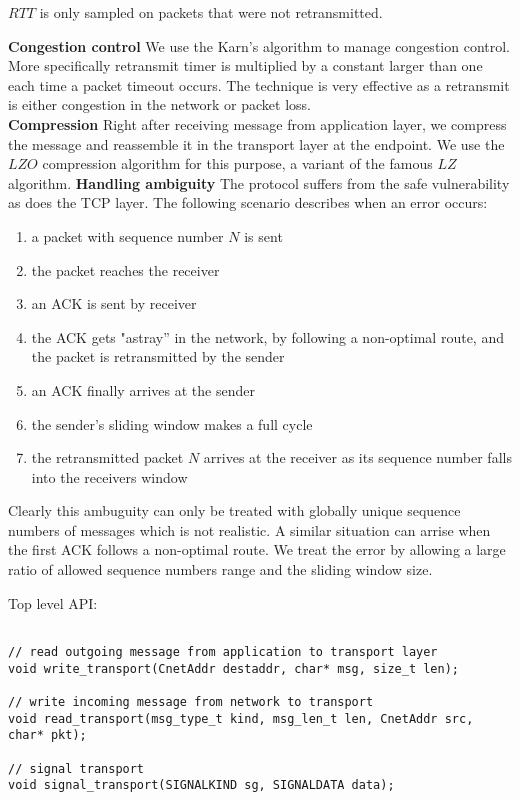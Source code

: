 \documentclass[11pt,a4paper,oneside]{report}
\begin{document}
$RTT$ is only sampled on packets that were not retransmitted. 

\noindent \textbf{Congestion control}
We use the Karn's algorithm to manage congestion control. More specifically
retransmit timer is multiplied by a constant larger than one each time a packet
timeout occurs. The technique is very effective as a retransmit is either
congestion in the network or packet loss. \\
\noindent \textbf{Compression}
Right after receiving message from application layer, we compress the message
and reassemble it in the transport layer at the endpoint. We use the $LZO$
compression algorithm for this purpose, a variant of the famous $LZ$ algorithm.
\noindent \textbf{Handling ambiguity}
The protocol suffers from the safe vulnerability as does the TCP layer. 
The following scenario describes when an error occurs:
\begin{enumerate}
\item a packet with sequence number $N$ is sent
\item the packet reaches the receiver
\item an ACK is sent by receiver
\item the ACK gets "astray'' in the network, by following a non-optimal route, and the packet is retransmitted by the sender
\item an ACK finally arrives at the sender
\item the sender's sliding window makes a full cycle
\item the retransmitted packet $N$ arrives at the receiver as its sequence number falls into the receivers window
\end{enumerate}

Clearly this ambuguity can only be treated with globally unique sequence numbers of messages which is not realistic.
A similar situation can arrise when the first ACK follows a non-optimal route. We treat the error by allowing
a large ratio of allowed sequence numbers range and the sliding window size.

    \newpage
    Top level API:  
 \begin{lstlisting}

// read outgoing message from application to transport layer
void write_transport(CnetAddr destaddr, char* msg, size_t len);

// write incoming message from network to transport
void read_transport(msg_type_t kind, msg_len_t len, CnetAddr src, char* pkt);

// signal transport
void signal_transport(SIGNALKIND sg, SIGNALDATA data);

  \end{lstlisting}
   
\end{document}
